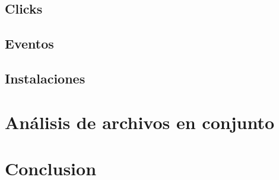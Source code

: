 \documentclass{article}
\begin{document}
\subsection{Clicks}

\subsection{Eventos}

\subsection{Instalaciones}

\section{Análisis de archivos en conjunto}

\section{Conclusion}




\end{document}
